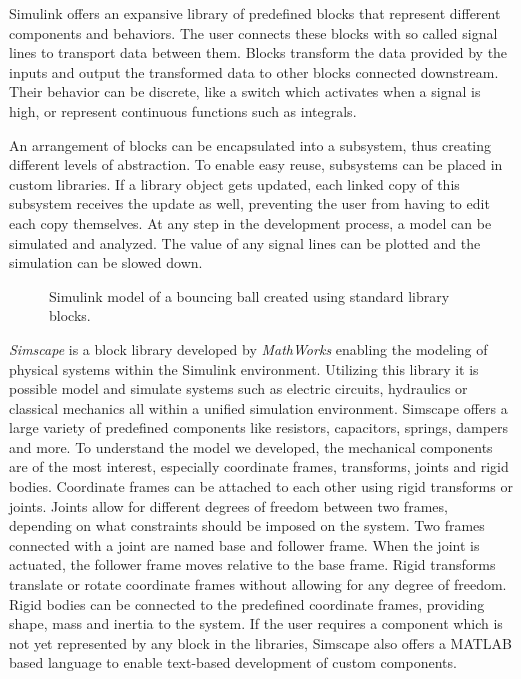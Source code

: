 Simulink offers an expansive library of predefined blocks that represent different components and behaviors.
The user connects these blocks with so called signal lines to transport data between them.
Blocks transform the data provided by the inputs and output the transformed data to other blocks connected downstream.
Their behavior can be discrete, like a switch which activates when a signal is high, or represent continuous functions such as integrals.

An arrangement of blocks can be encapsulated into a subsystem, thus creating different levels of abstraction.
To enable easy reuse, subsystems can be placed in custom libraries.
If a library object gets updated, each linked copy of this subsystem receives the update as well, preventing the user from having to edit each copy themselves.
At any step in the development process, a model can be simulated and analyzed.
The value of any signal lines can be plotted and the simulation can be slowed down.

\begin{figure}[h]
	\centerline{}
	\caption{Simulink model of a bouncing ball created using standard library blocks.}
	\label{figure: Simulink Bouncing Ball Example}
\end{figure}

\textit{Simscape\textsuperscript{\texttrademark}} is a block library developed by \textit{MathWorks\textsuperscript{\textregistered}} enabling the modeling of physical systems within the Simulink environment.
Utilizing this library it is possible model and simulate systems such as electric circuits, hydraulics or classical mechanics all within a unified simulation environment.
Simscape offers a large variety of predefined components like resistors, capacitors, springs, dampers and more.
To understand the model we developed, the mechanical components are of the most interest, especially coordinate frames, transforms, joints and rigid bodies.
Coordinate frames can be attached to each other using rigid transforms or joints.
Joints allow for different degrees of freedom between two frames, depending on what constraints should be imposed on the system.
Two frames connected with a joint are named base and follower frame.
When the joint is actuated, the follower frame moves relative to the base frame\parencite{thilderkvist2015motion}.
Rigid transforms translate or rotate coordinate frames without allowing for any degree of freedom.
Rigid bodies can be connected to the predefined coordinate frames, providing shape, mass and inertia to the system.
If the user requires a component which is not yet represented by any block in the libraries, Simscape also offers a MATLAB based language to enable text-based development of custom components.

